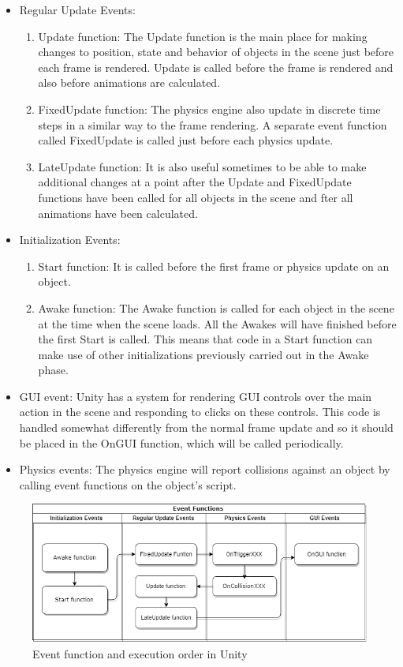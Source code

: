 \begin{itemize}
	\item Regular Update Events: 
	\begin{enumerate}
		\item Update function: The Update function is the main place for making changes to position, state and behavior of objects in the scene just before each frame is rendered. Update is called before the frame is rendered and also before animations are calculated.
		\item FixedUpdate function: The physics engine also update in discrete time steps in a similar way to the frame rendering. A separate event function called FixedUpdate is called just before each physics update.
		\item LateUpdate function: It is also useful sometimes to be able to make additional changes at a point after the Update and FixedUpdate functions have been called for all objects in the scene and fter all animations have been calculated.
	\end{enumerate}
	\item Initialization Events:
	\begin{enumerate}
		\item Start function: It is called before the first frame or physics update on an object.
		\item Awake function: The Awake function is called for each object in the scene at the time when the scene loads. All the Awakes will have finished before the first Start is called. This means that code in a Start function can make use of other initializations previously carried out in the Awake phase.
	\end{enumerate}
	\item GUI event: Unity has a system for rendering GUI controls over the main action in the scene and responding to clicks on these controls. This code is handled somewhat differently from the normal frame update and so it should be placed in the OnGUI function, which will be called periodically.
	\item Physics events: The physics engine will report collisions against an object by calling event functions on the object's script. 		
\end{itemize}
\begin{figure}[h]
	\centering
	\captionsetup{justification=centering}
	\includegraphics[width=\textwidth]{Figures/Section3_Eventfunction.png}
	\caption{Event function and execution order in Unity}
	\label{fig: event_function}
\end{figure}

